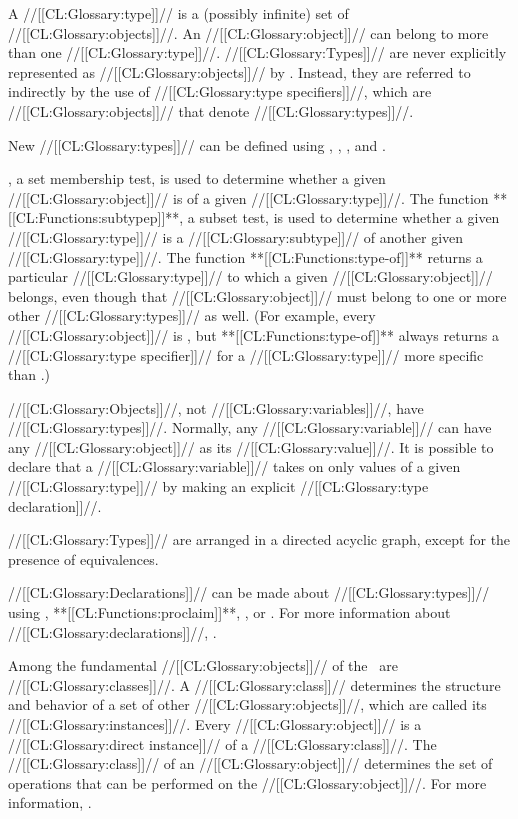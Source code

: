 

A //[[CL:Glossary:type]]// is a (possibly infinite) set of //[[CL:Glossary:objects]]//. An //[[CL:Glossary:object]]// can belong to more than one //[[CL:Glossary:type]]//.   //[[CL:Glossary:Types]]// are never explicitly represented as //[[CL:Glossary:objects]]// by \clisp. Instead, they are referred to indirectly by the use of //[[CL:Glossary:type specifiers]]//, which are //[[CL:Glossary:objects]]// that denote //[[CL:Glossary:types]]//.

New //[[CL:Glossary:types]]// can be defined using , ,  , and .

, a set membership test, is used to determine whether a given //[[CL:Glossary:object]]// is of a given //[[CL:Glossary:type]]//.  The function **[[CL:Functions:subtypep]]**, a subset test, is used to determine whether a given //[[CL:Glossary:type]]// is a //[[CL:Glossary:subtype]]// of another given //[[CL:Glossary:type]]//.  The function **[[CL:Functions:type-of]]** returns a particular //[[CL:Glossary:type]]// to which a given //[[CL:Glossary:object]]// belongs, even though that //[[CL:Glossary:object]]// must belong to one or more other //[[CL:Glossary:types]]// as well. (For example, every //[[CL:Glossary:object]]// is , 
 but **[[CL:Functions:type-of]]** always returns a //[[CL:Glossary:type specifier]]//
 for a //[[CL:Glossary:type]]// more specific than .)

//[[CL:Glossary:Objects]]//, not //[[CL:Glossary:variables]]//, have //[[CL:Glossary:types]]//. Normally, any //[[CL:Glossary:variable]]// can have any //[[CL:Glossary:object]]// as its //[[CL:Glossary:value]]//. It is possible to declare that a //[[CL:Glossary:variable]]// takes on only  values of a given //[[CL:Glossary:type]]// by making an explicit //[[CL:Glossary:type declaration]]//.

//[[CL:Glossary:Types]]// are arranged in a directed acyclic graph, except for the presence of equivalences. 

//[[CL:Glossary:Declarations]]// can be made about //[[CL:Glossary:types]]// using ,  **[[CL:Functions:proclaim]]**, , or . For more information about //[[CL:Glossary:declarations]]//, \seesection\Declarations.

Among the fundamental //[[CL:Glossary:objects]]// of the \CLOS\ are //[[CL:Glossary:classes]]//. A //[[CL:Glossary:class]]// determines the structure and behavior of a set of other //[[CL:Glossary:objects]]//, which are called its //[[CL:Glossary:instances]]//.  Every //[[CL:Glossary:object]]// is a //[[CL:Glossary:direct instance]]// of a //[[CL:Glossary:class]]//. The //[[CL:Glossary:class]]// of an //[[CL:Glossary:object]]// determines the set of operations that can be performed on the //[[CL:Glossary:object]]//. For more information, \seesection\Classes.

